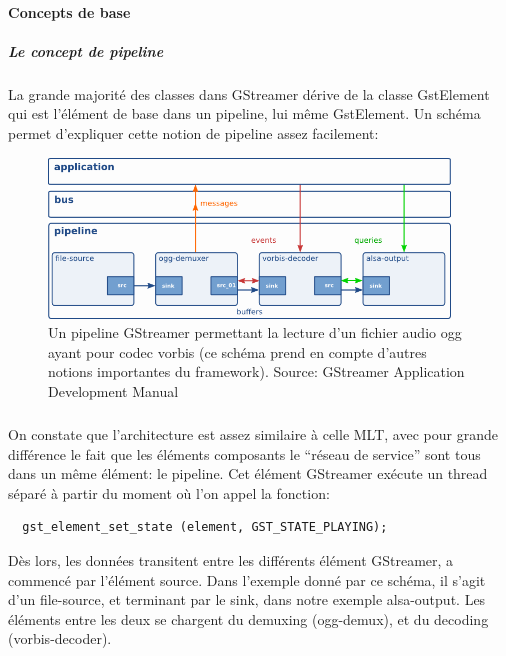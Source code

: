 \paragraph{Concepts de base}

\subparagraph{Le concept de pipeline}

\subparagraph{}

La grande majorité des classes dans GStreamer dérive de la classe
GstElement qui est l'élément de base dans un pipeline, lui même
GstElement. Un schéma permet d'expliquer cette notion de pipeline
assez facilement:

\begin{figure} [H]

  \begin{center}

    \includegraphics[width=0.95\textwidth]{images/gstpipeline}

  \end{center}

  \caption{Un pipeline GStreamer permettant la lecture d'un fichier
  audio ogg
    ayant pour codec vorbis (ce schéma prend en compte d'autres notions
    importantes du framework). Source: GStreamer Application Development
    Manual}

  \label{Yes}

\end{figure}

\subparagraph{}

On constate que l'architecture est assez similaire à celle
MLT, avec pour grande différence le fait que les éléments
composants le ``réseau de service'' sont tous dans un même élément:
le pipeline. Cet élément GStreamer exécute un thread séparé à
partir du moment où l'on appel la fonction:

\begin{lstlisting}
  gst_element_set_state (element, GST_STATE_PLAYING);
\end{lstlisting}


Dès lors, les données transitent entre les différents élément
GStreamer, a commencé par l'élément source. Dans l'exemple donné
par ce schéma, il s'agit d'un file-source, et terminant par le sink,
dans notre exemple alsa-output. Les éléments entre les deux se chargent
du demuxing (ogg-demux), et du decoding (vorbis-decoder).

